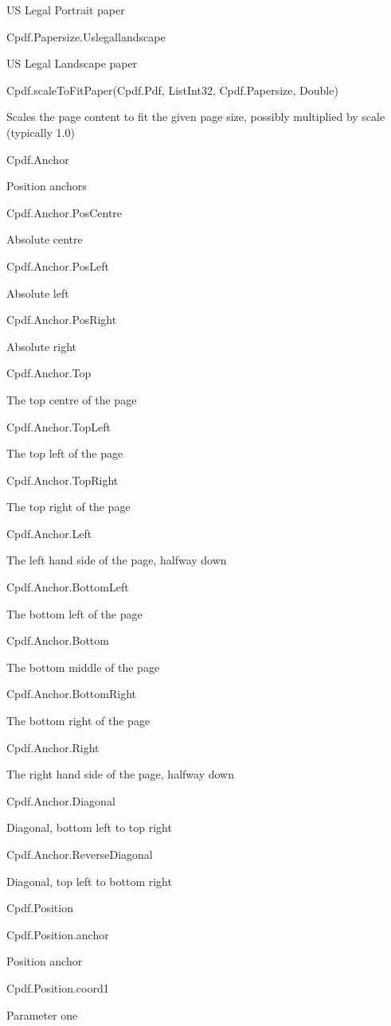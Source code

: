 US Legal Portrait paper

Cpdf.Papersize.Uslegallandscape

US Legal Landscape paper

Cpdf.scaleToFitPaper(Cpdf.Pdf, List{Int32}, Cpdf.Papersize, Double)


Scales the page content
to fit the given page size, possibly multiplied by scale (typically 1.0)


Cpdf.Anchor

Position anchors

Cpdf.Anchor.PosCentre

Absolute centre

Cpdf.Anchor.PosLeft

Absolute left

Cpdf.Anchor.PosRight

Absolute right

Cpdf.Anchor.Top

The top centre of the page

Cpdf.Anchor.TopLeft

The top left of the page

Cpdf.Anchor.TopRight

The top right of the page

Cpdf.Anchor.Left

The left hand side of the page, halfway down

Cpdf.Anchor.BottomLeft

The bottom left of the page

Cpdf.Anchor.Bottom

The bottom middle of the page

Cpdf.Anchor.BottomRight

The bottom right of the page

Cpdf.Anchor.Right

The right hand side of the page, halfway down

Cpdf.Anchor.Diagonal

Diagonal, bottom left to top right

Cpdf.Anchor.ReverseDiagonal

Diagonal, top left to bottom right

Cpdf.Position



Cpdf.Position.anchor

Position anchor

Cpdf.Position.coord1

Parameter one

